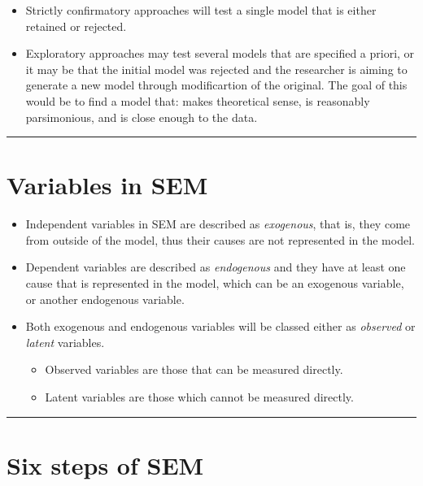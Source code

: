\documentclass[
]{book}
\providecommand{\tightlist}{%
  \setlength{\itemsep}{0pt}\setlength{\parskip}{0pt}}
\begin{document}
\begin{itemize}
  \begin{itemize}
  \tightlist
  \item
    Strictly confirmatory approaches will test a single model that is either retained or rejected.
  \item
    Exploratory approaches may test several models that are specified a priori, or it may be that the initial model was rejected and the researcher is aiming to generate a new model through modificartion of the original. The goal of this would be to find a model that: makes theoretical sense, is reasonably parsimonious, and is close enough to the data.
  \end{itemize}
\end{itemize}

\begin{center}\rule{0.5\linewidth}{0.5pt}\end{center}

\section{Variables in SEM}\label{variables-in-sem}

\begin{itemize}
\tightlist
\item
  Independent variables in SEM are described as \emph{exogenous}, that is, they come from outside of the model, thus their causes are not represented in the model.
\item
  Dependent variables are described as \emph{endogenous} and they have at least one cause that is represented in the model, which can be an exogenous variable, or another endogenous variable.
\item
  Both exogenous and endogenous variables will be classed either as \emph{observed} or \emph{latent} variables.

  \begin{itemize}
  \tightlist
  \item
    Observed variables are those that can be measured directly.
  \item
    Latent variables are those which cannot be measured directly.
  \end{itemize}
\end{itemize}

\begin{center}\rule{0.5\linewidth}{0.5pt}\end{center}

\section{Six steps of SEM}\label{six-steps-of-sem}
\end{document}
